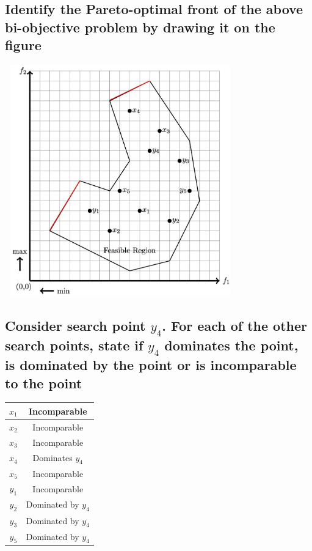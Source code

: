 \documentclass{article}
\begin{document}
\subsection{Identify the Pareto-optimal front of the above bi-objective problem by drawing it on the figure}

\includegraphics[width=10cm,height=10cm,keepaspectratio]{optFront}

\subsection{Consider search point $y_4$. For each of the other search points, state if $y_4$ dominates the point, is
dominated by the point or is incomparable to the point}

\begin{center}
\begin{tabular}{ |c|c| } 
 \hline
 $x_1$ & Incomparable \\ 
 \hline
 $x_2$ & Incomparable\\ 
 \hline
 $x_3$ & Incomparable \\ 
 \hline
 $x_4$ & Dominates $y_4$ \\ 
 \hline
 $x_5$ & Incomparable \\ 
 \hline
 $y_1$ & Incomparable \\ 
 \hline
 $y_2$ & Dominated by $y_4$ \\ 
 \hline
 $y_3$ & Dominated by $y_4$ \\  
 \hline
 $y_5$ & Dominated by $y_4$ \\ 
 \hline
\end{tabular}
\end{center}
\end{document}
